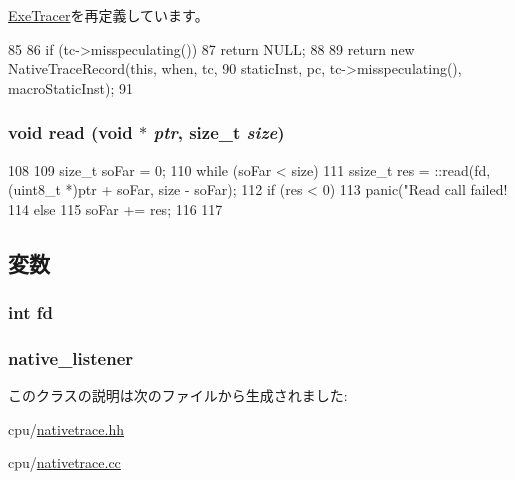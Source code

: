 \hyperlink{classTrace_1_1ExeTracer_a89ee504d255c652e5d54b73319d4d3dc}{ExeTracer}を再定義しています。


\begin{DoxyCode}
85     {
86         if (tc->misspeculating())
87             return NULL;
88 
89         return new NativeTraceRecord(this, when, tc,
90                 staticInst, pc, tc->misspeculating(), macroStaticInst);
91     }
\end{DoxyCode}
\hypertarget{classTrace_1_1NativeTrace_aebb629d36b64e2ff7e3351ca99614b12}{
\subsubsection[{read}]{\setlength{\rightskip}{0pt plus 5cm}void read (void $\ast$ {\em ptr}, \/  size\_\-t {\em size})}}
\label{classTrace_1_1NativeTrace_aebb629d36b64e2ff7e3351ca99614b12}



\begin{DoxyCode}
108     {
109         size_t soFar = 0;
110         while (soFar < size) {
111             ssize_t res = ::read(fd, (uint8_t *)ptr + soFar, size - soFar);
112             if (res < 0)
113                 panic("Read call failed! %
114             else
115                 soFar += res;
116         }
117     }
\end{DoxyCode}


\subsection{変数}
\hypertarget{classTrace_1_1NativeTrace_a6f8059414f0228f0256115e024eeed4b}{
\subsubsection[{fd}]{\setlength{\rightskip}{0pt plus 5cm}int {\bf fd}}}
\label{classTrace_1_1NativeTrace_a6f8059414f0228f0256115e024eeed4b}
\hypertarget{classTrace_1_1NativeTrace_a4957ac3d974f1eb7680753acb7741ff5}{
\subsubsection[{native\_\-listener}]{ {\bf native\_\-listener}}}
\label{classTrace_1_1NativeTrace_a4957ac3d974f1eb7680753acb7741ff5}


このクラスの説明は次のファイルから生成されました:\begin{DoxyCompactItemize}
\item 
cpu/\hyperlink{cpu_2nativetrace_8hh}{nativetrace.hh}\item 
cpu/\hyperlink{cpu_2nativetrace_8cc}{nativetrace.cc}\end{DoxyCompactItemize}
